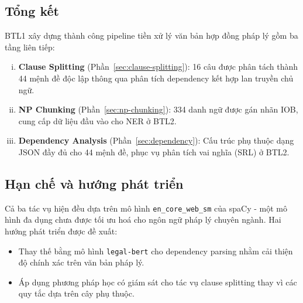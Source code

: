 \subsection{Tổng kết}

BTL1 xây dựng thành công pipeline tiền xử lý văn bản hợp đồng pháp lý
gồm ba tầng liên tiếp:

\begin{enumerate}[(i)]
    \item \textbf{Clause Splitting} (Phần~\ref{sec:clause-splitting}):
          16 câu được phân tách thành 44 mệnh đề độc lập thông qua phân
          tích dependency kết hợp lan truyền chủ ngữ.

    \item \textbf{NP Chunking} (Phần~\ref{sec:np-chunking}):
          334 danh ngữ được gán nhãn IOB, cung cấp dữ liệu đầu vào cho
          NER ở BTL2.

    \item \textbf{Dependency Analysis} (Phần~\ref{sec:dependency}):
          Cấu trúc phụ thuộc dạng JSON đầy đủ cho 44 mệnh đề, phục vụ
          phân tích vai nghĩa (SRL) ở BTL2.
\end{enumerate}

\subsection{Hạn chế và hướng phát triển}

Cả ba tác vụ hiện đều dựa trên mô hình \texttt{en\_core\_web\_sm} của
spaCy - một mô hình đa dụng chưa được tối ưu hoá cho ngôn ngữ pháp
lý chuyên ngành. Hai hướng phát triển được đề xuất:

\begin{itemize}
    \item Thay thế bằng mô hình \texttt{legal-bert} cho dependency
          parsing nhằm cải thiện độ chính xác trên văn bản pháp lý.
    \item Áp dụng phương pháp học có giám sát cho tác vụ clause
          splitting thay vì các quy tắc dựa trên cây phụ thuộc.
\end{itemize}
